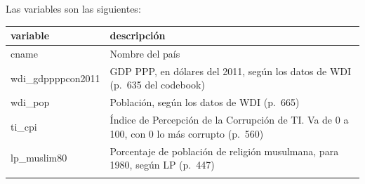\documentclass[]{book}
\begin{document}
Las variables son las siguientes:

\begin{longtable}[]{@{}ll@{}}
\toprule
\begin{minipage}[b]{0.16\columnwidth}\raggedright\strut
variable\strut
\end{minipage} & \begin{minipage}[b]{0.78\columnwidth}\raggedright\strut
descripción\strut
\end{minipage}\tabularnewline
\midrule
\endhead
\begin{minipage}[t]{0.16\columnwidth}\raggedright\strut
cname\strut
\end{minipage} & \begin{minipage}[t]{0.78\columnwidth}\raggedright\strut
Nombre del país\strut
\end{minipage}\tabularnewline
\begin{minipage}[t]{0.16\columnwidth}\raggedright\strut
wdi\_gdppppcon2011\strut
\end{minipage} & \begin{minipage}[t]{0.78\columnwidth}\raggedright\strut
GDP PPP, en dólares del 2011, según los datos de WDI (p.~635 del
codebook)\strut
\end{minipage}\tabularnewline
\begin{minipage}[t]{0.16\columnwidth}\raggedright\strut
wdi\_pop\strut
\end{minipage} & \begin{minipage}[t]{0.78\columnwidth}\raggedright\strut
Población, según los datos de WDI (p.~665)\strut
\end{minipage}\tabularnewline
\begin{minipage}[t]{0.16\columnwidth}\raggedright\strut
ti\_cpi\strut
\end{minipage} & \begin{minipage}[t]{0.78\columnwidth}\raggedright\strut
Índice de Percepción de la Corrupción de TI. Va de 0 a 100, con 0 lo más
corrupto (p.~560)\strut
\end{minipage}\tabularnewline
\begin{minipage}[t]{0.16\columnwidth}\raggedright\strut
lp\_muslim80\strut
\end{minipage} & \begin{minipage}[t]{0.78\columnwidth}\raggedright\strut
Porcentaje de población de religión musulmana, para 1980, según LP
(p.~447)\strut
\end{minipage}\tabularnewline
\begin{minipage}[t]{0.16\columnwidth}\raggedright\strut

\end{minipage}
\end{longtable}
\end{document}
